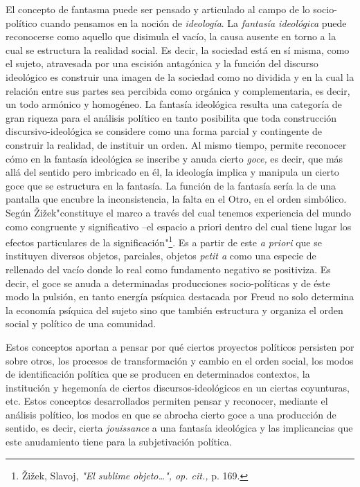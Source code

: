 \documentclass{book}
\begin{document}
El concepto de fantasma puede ser pensado y articulado al campo de lo
socio-político cuando pensamos en la noción de \emph{ideología}. La
\emph{fantasía ideológica} puede reconocerse como aquello que disimula
el vacío, la causa ausente en torno a la cual se estructura la realidad
social. Es decir, la sociedad está en sí misma, como el sujeto,
atravesada por una escisión antagónica y la función del discurso
ideológico es construir una imagen de la sociedad como no dividida y en
la cual la relación entre sus partes sea percibida como orgánica y
complementaria, es decir, un todo armónico y homogéneo. La fantasía
ideológica resulta una categoría de gran riqueza para el análisis
político en tanto posibilita que toda construcción discursivo-ideológica
se considere como una forma parcial y contingente de construir la
realidad, de instituir un orden. Al mismo tiempo, permite reconocer cómo
en la fantasía ideológica se inscribe y anuda cierto \emph{goce,} es
decir, que más allá del sentido pero imbricado en él, la ideología
implica y manipula un cierto goce que se estructura en la fantasía. La
función de la fantasía sería la de una pantalla que encubre la
inconsistencia, la falta en el Otro, en el orden simbólico. Según
Žižek"constituye el marco a través del cual tenemos experiencia del
mundo como congruente y significativo --el espacio a priori dentro del
cual tiene lugar los efectos particulares de la
significación"\footnote{Žižek, Slavoj, \emph{"El sublime objeto\ldots",
  op. cit.,} p. 169.}. Es a partir de este \emph{a priori} que se
instituyen diversos objetos, parciales, objetos \emph{petit a} como una
especie de rellenado del vacío donde lo real como fundamento negativo se
positiviza. Es decir, el goce se anuda a determinadas producciones
socio-políticas y de éste modo la pulsión, en tanto energía psíquica
destacada por Freud no solo determina la economía psíquica del sujeto
sino que también estructura y organiza el orden social y político de una
comunidad.

Estos conceptos aportan a pensar por qué ciertos proyectos políticos
persisten por sobre otros, los procesos de transformación y cambio en el
orden social, los modos de identificación política que se producen en
determinados contextos, la institución y hegemonía de ciertos
discursos-ideológicos en un ciertas coyunturas, etc. Estos conceptos
desarrollados permiten pensar y reconocer, mediante el análisis
político, los modos en que se abrocha cierto goce a una producción de
sentido, es decir, cierta \emph{jouissance} a una fantasía ideológica y
las implicancias que este anudamiento tiene para la subjetivación
política.
\end{document}
